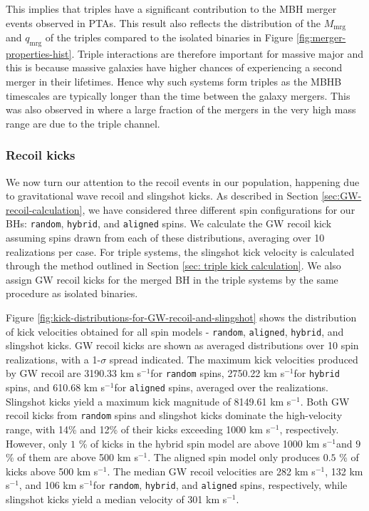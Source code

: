 \documentclass[11pt, letterpaper]{article}
\newcommand{\kms}{km s$^{-1}$}
\begin{document}
This implies that triples have a significant contribution to the MBH merger events observed in PTAs. This result also reflects the distribution of the $M_{\text{mrg}}$ and $q_{\text{mrg}}$ of the triples compared to the isolated binaries in Figure \ref{fig:merger-properties-hist}. Triple interactions are therefore important for massive major and this is because massive galaxies have higher chances of experiencing a second merger in their lifetimes. Hence why such systems form triples as the MBHB timescales are typically longer than the time between the galaxy mergers. This was also observed in \cite{bonetti_post-newtonian_2018} where a large fraction of the mergers in the very high mass range are due to the triple channel. 



\subsubsection{Recoil kicks}
\label{sec:recoil-kicks-result}

We now turn our attention to the recoil events in our population, happening due to gravitational wave recoil and slingshot kicks. As described in Section \ref{sec:GW-recoil-calculation}, we have considered three different spin configurations for our BHs: \texttt{random}, \texttt{hybrid}, and \texttt{aligned} spins. We calculate the GW recoil kick assuming spins drawn from each of these distributions, averaging over 10 realizations per case. For triple systems, the slingshot kick velocity is calculated through the method outlined in Section \ref{sec: triple kick calculation}. We also assign GW recoil kicks for the merged BH in the triple systems by the same procedure as isolated binaries. 

Figure \ref{fig:kick-distributions-for-GW-recoil-and-slingshot} shows the distribution of kick velocities obtained for all spin models - \texttt{random}, \texttt{aligned}, \texttt{hybrid}, and slingshot kicks. GW recoil kicks are shown as averaged distributions over 10 spin realizations, with a 1-$\sigma$ spread indicated. The maximum kick velocities produced by GW recoil are 3190.33 \kms for \texttt{random} spins, 2750.22 \kms for \texttt{hybrid} spins, and 610.68 \kms for \texttt{aligned} spins, averaged over the realizations. Slingshot kicks yield a maximum kick magnitude of 8149.61 \kms. Both GW recoil kicks from \texttt{random} spins and slingshot kicks dominate the high-velocity range, with 14\% and 12\% of their kicks exceeding 1000 \kms, respectively. However, only $1$ \% of kicks in the hybrid spin model are above 1000 \kms and $9$ \% of them are above 500 \kms. The aligned spin model only produces $0.5$ \% of kicks above 500 \kms. The median GW recoil velocities are 282 \kms, 132 \kms, and 106 \kms for \texttt{random}, \texttt{hybrid}, and \texttt{aligned} spins, respectively, while slingshot kicks yield a median velocity of 301 \kms.
\end{document}

